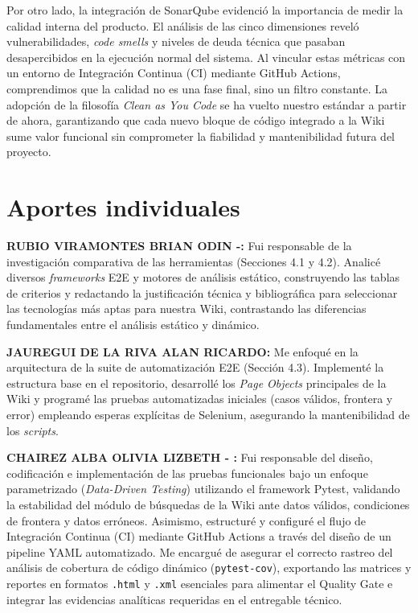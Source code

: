 \documentclass[12pt]{article}
\begin{document}
Por otro lado, la integración de SonarQube evidenció la importancia de medir la calidad interna del producto. El análisis de las cinco dimensiones reveló vulnerabilidades, \textit{code smells} y niveles de deuda técnica que pasaban desapercibidos en la ejecución normal del sistema. Al vincular estas métricas con un entorno de Integración Continua (CI) mediante GitHub Actions, comprendimos que la calidad no es una fase final, sino un filtro constante. La adopción de la filosofía \textit{Clean as You Code} se ha vuelto nuestro estándar a partir de ahora, garantizando que cada nuevo bloque de código integrado a la Wiki sume valor funcional sin comprometer la fiabilidad y mantenibilidad futura del proyecto.

\section{Aportes individuales}

\textbf{RUBIO VIRAMONTES BRIAN ODIN -:} Fui responsable de la investigación comparativa de las herramientas (Secciones 4.1 y 4.2). Analicé diversos \textit{frameworks} E2E y motores de análisis estático, construyendo las tablas de criterios y redactando la justificación técnica y bibliográfica para seleccionar las tecnologías más aptas para nuestra Wiki, contrastando las diferencias fundamentales entre el análisis estático y dinámico.

\textbf{JAUREGUI DE LA RIVA ALAN RICARDO:} Me enfoqué en la arquitectura de la suite de automatización E2E (Sección 4.3). Implementé la estructura base en el repositorio, desarrollé los \textit{Page Objects} principales de la Wiki y programé las pruebas automatizadas iniciales (casos válidos, frontera y error) empleando esperas explícitas de Selenium, asegurando la mantenibilidad de los \textit{scripts}.

\textbf{CHAIREZ ALBA OLIVIA LIZBETH - :} Fui responsable del diseño, codificación e implementación de las pruebas funcionales bajo un enfoque parametrizado (\textit{Data-Driven Testing}) utilizando el framework Pytest, validando la estabilidad del módulo de búsquedas de la Wiki ante datos válidos, condiciones de frontera y datos erróneos. Asimismo, estructuré y configuré el flujo de Integración Continua (CI) mediante GitHub Actions a través del diseño de un pipeline YAML automatizado. Me encargué de asegurar el correcto rastreo del análisis de cobertura de código dinámico (\texttt{pytest-cov}), exportando las matrices y reportes en formatos \texttt{.html} y \texttt{.xml} esenciales para alimentar el Quality Gate e integrar las evidencias analíticas requeridas en el entregable técnico.
\end{document}
